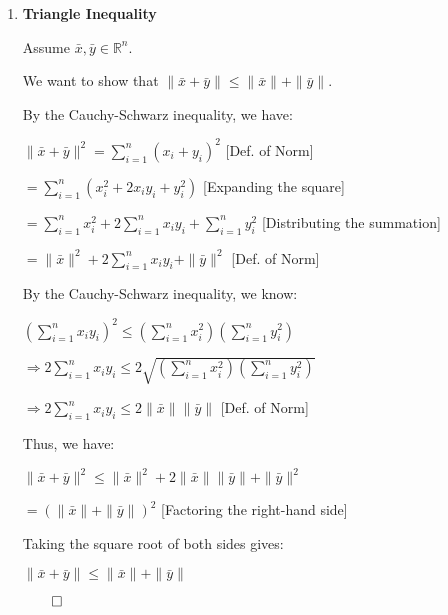 \begin{proofbox}
\begin{enumerate}[label=\arabic*., series=normprops]
    We want to show that $\|c \bar{x}\| = |c| \|\bar{x}\|$.

    \quad $\|c \bar{x}\| = \sqrt{(c x_1)^2 + (c x_2)^2 + \cdots + (c x_n)^2}$ \hfill [Def. of Norm]

    \quad $= \sqrt{c^2 (x_1^2 + x_2^2 + \cdots + x_n^2)}$ \hfill [Factoring out $c^2$]

    \quad $= |c| \sqrt{x_1^2 + x_2^2 + \cdots + x_n^2}$ \hfill [Square root of $c^2$ is $|c|$]

    \quad $= |c| \|\bar{x}\|$ \hfill [Def. of Norm]

    \hfill $\qed$

    \item \textbf{Triangle Inequality}
    
    Assume $\bar{x}, \bar{y} \in \mathbb{R}^n$.

    We want to show that $\|\bar{x} + \bar{y}\| \leq \|\bar{x}\| + \|\bar{y}\|$.

    By the Cauchy-Schwarz inequality, we have:

    \quad $\|\bar{x} + \bar{y}\|^2 = \sum_{i=1}^n (x_i + y_i)^2$ \hfill [Def. of Norm]

    \quad $= \sum_{i=1}^n (x_i^2 + 2 x_i y_i + y_i^2)$ \hfill [Expanding the square]

    \quad $= \sum_{i=1}^n x_i^2 + 2 \sum_{i=1}^n x_i y_i + \sum_{i=1}^n y_i^2$ \hfill [Distributing the summation]

    \quad $= \|\bar{x}\|^2 + 2 \sum_{i=1}^n x_i y_i + \|\bar{y}\|^2$ \hfill [Def. of Norm]

    By the Cauchy-Schwarz inequality, we know:

    \quad $\left( \sum_{i=1}^n x_i y_i \right)^2 \leq \left( \sum_{i=1}^n x_i^2 \right) \left( \sum_{i=1}^n y_i^2 \right)$

    \quad $\Rightarrow 2 \sum_{i=1}^n x_i y_i \leq 2 \sqrt{\left( \sum_{i=1}^n x_i^2 \right) \left( \sum_{i=1}^n y_i^2 \right)}$

    \quad $\Rightarrow 2 \sum_{i=1}^n x_i y_i \leq 2 \|\bar{x}\| \|\bar{y}\|$ \hfill [Def. of Norm]

    Thus, we have:

    \quad $\|\bar{x} + \bar{y}\|^2 \leq \|\bar{x}\|^2 + 2 \|\bar{x}\| \|\bar{y}\| + \|\bar{y}\|^2$

    \quad $= (\|\bar{x}\| + \|\bar{y}\|)^2$ \hfill [Factoring the right-hand side]

    Taking the square root of both sides gives:

    \quad $\|\bar{x} + \bar{y}\| \leq \|\bar{x}\| + \|\bar{y}\|$

    \hfill $\qed$
    
\end{enumerate}
\end{proofbox}